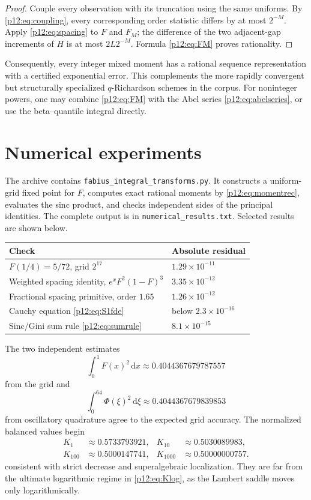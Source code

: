 \documentclass[11pt,oneside]{article}
\theoremstyle{definition}
\theoremstyle{remark}
\newcommand{\F}{F}
\newcommand{\dd}{\,\mathrm d}
\newcommand{\1}{\mathbf 1}
\begin{document}
\begin{proof}
Couple every observation with its truncation using the same uniforms.  By
\eqref{p12:eq:coupling}, every corresponding order statistic differs by at most
\(2^{-M}\).  Apply \eqref{p12:eq:spacing} to \(\F\) and \(\F_M\); the difference of
the two adjacent-gap increments of \(H\) is at most \(2L2^{-M}\).  Formula
\eqref{p12:eq:FM} proves rationality.
\end{proof}

Consequently, every integer mixed moment has a rational sequence representation
with a certified exponential error.  This complements the more rapidly
convergent but structurally specialized \(q\)-Richardson schemes in the corpus.
For noninteger powers, one may combine \eqref{p12:eq:FM} with the Abel series
\eqref{p12:eq:abelseries}, or use the beta--quantile integral directly.

\section{Numerical experiments}

The archive contains \texttt{fabius\_integral\_transforms.py}.  It constructs a
uniform-grid fixed point for \(\F\), computes exact rational moments by
\eqref{p12:eq:momentrec}, evaluates the sinc product, and checks independent sides
of the principal identities.  The complete output is in
\texttt{numerical\_results.txt}.  Selected results are shown below.

\begin{center}
\begin{tabular}{@{}ll@{}}
\toprule
Check & Absolute residual \\
\midrule
\(\F(1/4)=5/72\), grid \(2^{17}\) & \(1.29\times10^{-11}\) \\
Weighted spacing identity, \(e^x\F^2(1-\F)^3\) & \(3.35\times10^{-12}\) \\
Fractional spacing primitive, order \(1.65\) & \(1.26\times10^{-12}\) \\
Cauchy equation \eqref{p12:eq:S1fde} & below \(2.3\times10^{-16}\) \\
Sinc/Gini sum rule \eqref{p12:eq:sumrule} & \(8.1\times10^{-15}\) \\
\bottomrule
\end{tabular}
\end{center}

The two independent estimates
\[
 \int_0^1\F(x)^2\dd x\approx0.4044367679787557
\]
from the grid and
\[
 \int_0^{64}\Phi(\xi)^2\dd\xi
 \approx0.4044367679839853
\]
from oscillatory quadrature agree to the expected grid accuracy.  The normalized
balanced values begin
\[
 \begin{aligned}
 K_1&\approx0.5733793921,
 &K_{10}&\approx0.5030089983,\\
 K_{100}&\approx0.5000147741,
 &K_{1000}&\approx0.50000000757.
 \end{aligned}
\]
consistent with strict decrease and superalgebraic localization.  They are far
from the ultimate logarithmic regime in \eqref{p12:eq:Klog}, as the Lambert saddle
moves only logarithmically.
\end{document}
